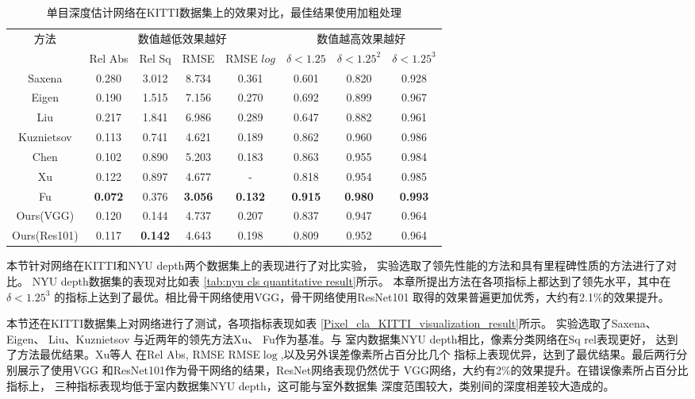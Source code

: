   \begin{table}[htb]
    \centering
    \caption{单目深度估计网络在KITTI数据集上的效果对比，最佳结果使用加粗处理}
    \label{tab:kitti cls quantitative result}
    \begin{tabular}{c|cccc|ccc}
      \toprule
      \multirow{2}{*}{方法} & \multicolumn{4}{c}{数值越低效果越好}&\multicolumn{3}{|c}{数值越高效果越好}\\
      & Rel Abs & Rel Sq & RMSE& RMSE $log$ &$\delta<1.25$ &$\delta<1.25^2$ & $\delta<1.25^3$ \\   
      \midrule            
      Saxena\cite{Make3D}&0.280&3.012&8.734&0.361&0.601&0.820&0.928\\
      Eigen\cite{eigen2014depth}&0.190&1.515&7.156&0.270&0.692&0.899&0.967\\
      Liu\cite{liu2015learning}&0.217&1.841&6.986&0.289&0.647&0.882&0.961\\
      Kuznietsov\cite{kuznietsov}&0.113&0.741&4.621&0.189&0.862&0.960&0.986\\
      Chen\cite{2019semantic}&0.102&0.890&5.203&0.183&0.863&0.955&0.984\\
      Xu\cite{xu2018structured}&0.122&0.897&4.677&-&0.818&0.954&0.985\\
      Fu\cite{FuCVPR18-DORN}&\textbf{0.072}&0.376&\textbf{3.056}&\textbf{0.132}&\textbf{0.915}&\textbf{0.980}&\textbf{0.993}\\
      Ours(VGG)&0.120&0.144&4.737&0.207&0.837&0.947&0.964\\
      Ours(Res101)&0.117&\textbf{0.142}&4.643&0.198&0.809&0.952&0.964\\
      \bottomrule
    \end{tabular}
  \end{table}
本节针对网络在KITTI和NYU depth两个数据集上的表现进行了对比实验，
实验选取了领先性能的方法和具有里程碑性质的方法进行了对比。
NYU depth数据集的表现对比如表
\ref{tab:nyu cls quantitative result}所示。
本章所提出方法在各项指标上都达到了领先水平，其中在$\delta<1.25^3$
的指标上达到了最优。相比骨干网络使用VGG，骨干网络使用ResNet101
取得的效果普遍更加优秀，大约有2.1\%的效果提升。

本节还在KITTI数据集上对网络进行了测试，各项指标表现如表
\ref{Pixel_cla_KITTI_visualization_result}所示。
实验选取了Saxena\cite{Make3D}、Eigen\cite{eigen2014depth}、
Liu\cite{liu2015learning}、Kuznietsov\cite{kuznietsov}
与近两年的领先方法Xu\cite{xu2018structured}、
Fu\cite{FuCVPR18-DORN}作为基准。与
室内数据集NYU depth相比，像素分类网络在Sq rel表现更好，
达到了方法最优结果。Xu等人\cite{xu2018structured}
在Rel Abs, RMSE RMSE$\log$,以及另外误差像素所占百分比几个
指标上表现优异，达到了最优结果。最后两行分别展示了使用VGG
和ResNet101作为骨干网络的结果，ResNet网络表现仍然优于
VGG网络，大约有2\%的效果提升。在错误像素所占百分比指标上，
三种指标表现均低于室内数据集NYU depth，这可能与室外数据集
深度范围较大，类别间的深度相差较大造成的。

